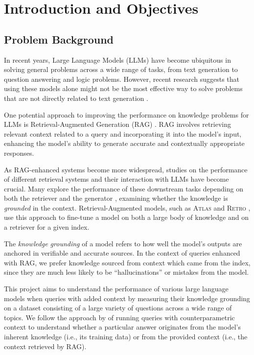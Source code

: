 \section{Introduction and Objectives}

\subsection{Problem Background}

In recent years, Large Language Models (LLMs) have become ubiquitous in solving general problems across a wide range of tasks, from text generation to question answering and logic problems.
However, recent research suggests that using these models alone might not be the most effective way to solve problems that are not directly related to text generation \citep{treeofthoughts}.

One potential approach to improving the performance on knowledge problems for LLMs is Retrieval-Augmented Generation (RAG) \citep{rag}. RAG involves retrieving relevant context related to a query and incorporating it into the model's input, enhancing the model's ability to generate accurate and contextually appropriate responses.

As RAG-enhanced systems become more widespread, studies on the performance of different retrieval systems and their interaction with LLMs have become crucial.
Many explore the performance of these downstream tasks depending on both the retriever and the generator \citep{can_rag_models_reason,gpt3}, examining whether the knowledge is \textit{grounded} in the context.
Retrieval-Augmented models, such as \textsc{Atlas} \citep{atlas_foundational} and \textsc{Retro} \citep{retro}, use this approach to fine-tune a model on both a large body of knowledge and on a retriever for a given index.

The \textit{knowledge grounding} of a model refers to how well the model's outputs are anchored in verifiable and accurate sources.
In the context of queries enhanced with RAG, we prefer knowledge sourced from context which came from the index, since they are much less likely to be ``hallucinations'' or mistakes from the model.

This project aims to understand the performance of various large language models when queries with added context by measuring their knowledge grounding on a dataset consisting of a large variety of questions across a wide range of topics.
We follow the approach by \citeauthor{factual_recall} of running queries with counterparametric context to understand whether a particular answer originates from the model's inherent knowledge (i.e., its training data) or from the provided context (i.e., the context retrieved by RAG).


